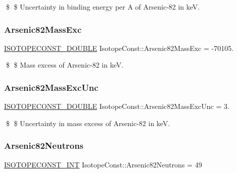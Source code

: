 \$ \$ Uncertainty in binding energy per A of Arsenic-\/82 in keV. \mbox{\label{group___isotope_const-_arsenic-_as82_ga1c3fc2ed2ff57cfe46fc218620011b59}} 
\subsubsection{\texorpdfstring{Arsenic82\+Mass\+Exc}{Arsenic82MassExc}}
{\footnotesize\ttfamily \mbox{\hyperlink{group___isotope_const-_macros_ga8f45a7272ce02c0b4c65c44636ed719a}{I\+S\+O\+T\+O\+P\+E\+C\+O\+N\+S\+T\+\_\+\+D\+O\+U\+B\+LE}} Isotope\+Const\+::\+Arsenic82\+Mass\+Exc = -\/70105.}

\$ \$ Mass excess of Arsenic-\/82 in keV. \mbox{\label{group___isotope_const-_arsenic-_as82_gac62c967bf1c8ce0ac03327a7cc4a937f}} 
\subsubsection{\texorpdfstring{Arsenic82\+Mass\+Exc\+Unc}{Arsenic82MassExcUnc}}
{\footnotesize\ttfamily \mbox{\hyperlink{group___isotope_const-_macros_ga8f45a7272ce02c0b4c65c44636ed719a}{I\+S\+O\+T\+O\+P\+E\+C\+O\+N\+S\+T\+\_\+\+D\+O\+U\+B\+LE}} Isotope\+Const\+::\+Arsenic82\+Mass\+Exc\+Unc = 3.}

\$ \$ Uncertainty in mass excess of Arsenic-\/82 in keV. \mbox{\label{group___isotope_const-_arsenic-_as82_ga06d09ae0da934613b92518971c12e98e}} 
\subsubsection{\texorpdfstring{Arsenic82\+Neutrons}{Arsenic82Neutrons}}
{\footnotesize\ttfamily \mbox{\hyperlink{group___isotope_const-_macros_ga5f18360b3e99483a35c32d789e62621c}{I\+S\+O\+T\+O\+P\+E\+C\+O\+N\+S\+T\+\_\+\+I\+NT}} Isotope\+Const\+::\+Arsenic82\+Neutrons = 49}


